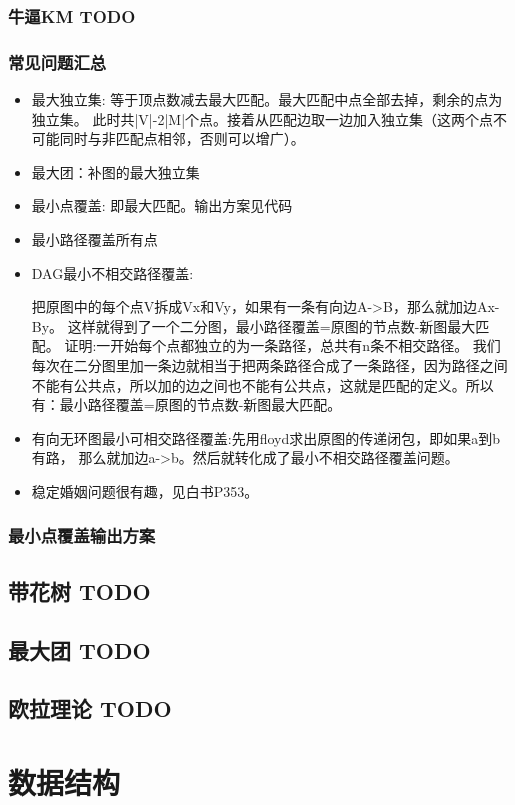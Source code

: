 \documentclass[landscape]{report}
\newcommand{\includecode}[2][c]{}
\begin{document}
\begin{flushleft}
\begin{multicols}{2}
\subsection{ 牛逼KM TODO}

\subsection{ 常见问题汇总}
\begin{itemize}
\item 最大独立集: 等于顶点数减去最大匹配。最大匹配中点全部去掉，剩余的点为独立集。 此时共|V|-2|M|个点。接着从匹配边取一边加入独立集（这两个点不可能同时与非匹配点相邻，否则可以增广）。
\item 最大团：补图的最大独立集
\item 最小点覆盖: 即最大匹配。输出方案见代码
\item 最小路径覆盖所有点
\item DAG最小不相交路径覆盖:

把原图中的每个点V拆成Vx和Vy，如果有一条有向边A->B，那么就加边Ax-By。 这样就得到了一个二分图，最小路径覆盖=原图的节点数-新图最大匹配。
证明:一开始每个点都独立的为一条路径，总共有n条不相交路径。
我们每次在二分图里加一条边就相当于把两条路径合成了一条路径，因为路径之间不能有公共点，所以加的边之间也不能有公共点，这就是匹配的定义。所以有：最小路径覆盖=原图的节点数-新图最大匹配。

\item 有向无环图最小可相交路径覆盖:先用floyd求出原图的传递闭包，即如果a到b有路， 那么就加边a->b。然后就转化成了最小不相交路径覆盖问题。
\item  稳定婚姻问题很有趣，见白书P353。
\end{itemize}
\subsection{ 最小点覆盖输出方案}
\includecode[c++]{uva11419.cpp}
\section{ 带花树 TODO}
\section{ 最大团 TODO}
\section{ 欧拉理论 TODO}


\chapter{数据结构}

\end{multicols}
\end{flushleft}
\end{document}
